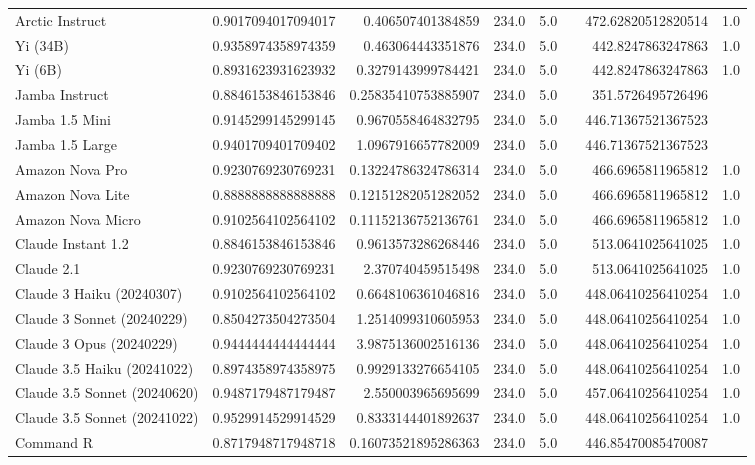 \begin{table}[htp]
{\begin{tabular}{lrrrrrrr}
Arctic Instruct & 0.9017094017094017 & 0.406507401384859 & 234.0 & 5.0 &  & 472.62820512820514 & 1.0 \\
Yi (34B) & 0.9358974358974359 & 0.463064443351876 & 234.0 & 5.0 &  & 442.8247863247863 & 1.0 \\
Yi (6B) & 0.8931623931623932 & 0.3279143999784421 & 234.0 & 5.0 &  & 442.8247863247863 & 1.0 \\
Jamba Instruct & 0.8846153846153846 & 0.25835410753885907 & 234.0 & 5.0 &  & 351.5726495726496 &  \\
Jamba 1.5 Mini & 0.9145299145299145 & 0.9670558464832795 & 234.0 & 5.0 &  & 446.71367521367523 &  \\
Jamba 1.5 Large & 0.9401709401709402 & 1.0967916657782009 & 234.0 & 5.0 &  & 446.71367521367523 &  \\
Amazon Nova Pro & 0.9230769230769231 & 0.13224786324786314 & 234.0 & 5.0 &  & 466.6965811965812 & 1.0 \\
Amazon Nova Lite & 0.8888888888888888 & 0.12151282051282052 & 234.0 & 5.0 &  & 466.6965811965812 & 1.0 \\
Amazon Nova Micro & 0.9102564102564102 & 0.11152136752136761 & 234.0 & 5.0 &  & 466.6965811965812 & 1.0 \\
Claude Instant 1.2 & 0.8846153846153846 & 0.9613573286268446 & 234.0 & 5.0 &  & 513.0641025641025 & 1.0 \\
Claude 2.1 & 0.9230769230769231 & 2.370740459515498 & 234.0 & 5.0 &  & 513.0641025641025 & 1.0 \\
Claude 3 Haiku (20240307) & 0.9102564102564102 & 0.6648106361046816 & 234.0 & 5.0 &  & 448.06410256410254 & 1.0 \\
Claude 3 Sonnet (20240229) & 0.8504273504273504 & 1.2514099310605953 & 234.0 & 5.0 &  & 448.06410256410254 & 1.0 \\
Claude 3 Opus (20240229) & 0.9444444444444444 & 3.9875136002516136 & 234.0 & 5.0 &  & 448.06410256410254 & 1.0 \\
Claude 3.5 Haiku (20241022) & 0.8974358974358975 & 0.9929133276654105 & 234.0 & 5.0 &  & 448.06410256410254 & 1.0 \\
Claude 3.5 Sonnet (20240620) & 0.9487179487179487 & 2.550003965695699 & 234.0 & 5.0 &  & 457.06410256410254 & 1.0 \\
Claude 3.5 Sonnet (20241022) & 0.9529914529914529 & 0.8333144401892637 & 234.0 & 5.0 &  & 448.06410256410254 & 1.0 \\
Command R & 0.8717948717948718 & 0.16073521895286363 & 234.0 & 5.0 &  & 446.85470085470087 &  \\

\end{tabular}}
\end{table}
